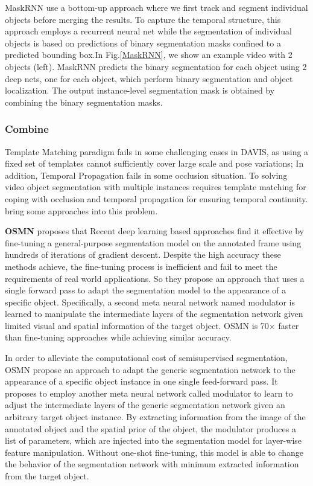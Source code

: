 MaskRNN use a bottom-up approach where we first track and segment individual objects before merging the results. To capture the temporal structure, this approach employs a recurrent neural net while the segmentation of individual objects is based on predictions of binary segmentation masks confined to a predicted bounding box.In Fig.\ref{MaskRNN}, we show an example video with 2 objects (left). MaskRNN predicts the binary segmentation for each object using 2 deep nets, one for each object, which perform binary segmentation and object localization. The output instance-level segmentation mask is obtained by combining the binary segmentation masks.



\subsubsection{Combine}
Template Matching paradigm fails in some challenging cases in DAVIS, as using a fixed set of templates cannot sufficiently cover large scale and pose variations; In addition, Temporal Propagation fails in some occlusion situation.  To solving video object segmentation with multiple instances requires template matching for coping with occlusion and temporal propagation for ensuring temporal continuity. \cite{OSMN}\cite{DyeNet} bring some approaches into this problem.



\textbf{OSMN}\cite{OSMN} proposes that Recent deep learning based approaches find it effective by fine-tuning a general-purpose segmentation model on the annotated frame using hundreds of iterations of gradient descent. Despite the high accuracy these methods achieve, the fine-tuning process is inefficient and fail to meet the requirements of real world applications. So they propose an approach that uses a single forward pass to adapt the segmentation model to the appearance of a specific object. Specifically, a second meta neural network named modulator is learned to manipulate the intermediate layers of the segmentation network given limited visual and spatial information of the target object. OSMN is 70× faster than fine-tuning approaches while achieving similar accuracy.

In order to alleviate the computational cost of semisupervised segmentation, OSMN propose an approach to adapt the generic segmentation network to the appearance of a specific object instance in one single feed-forward pass. It proposes to employ another meta neural network called modulator to learn to adjust the intermediate layers of the generic segmentation network given an arbitrary target object instance. By extracting information from the image of the annotated object and the spatial prior of the object, the modulator produces a list of parameters, which are injected into the segmentation model for layer-wise feature manipulation. Without one-shot fine-tuning, this model is able to change the behavior of the segmentation network with minimum extracted information from the target object.

